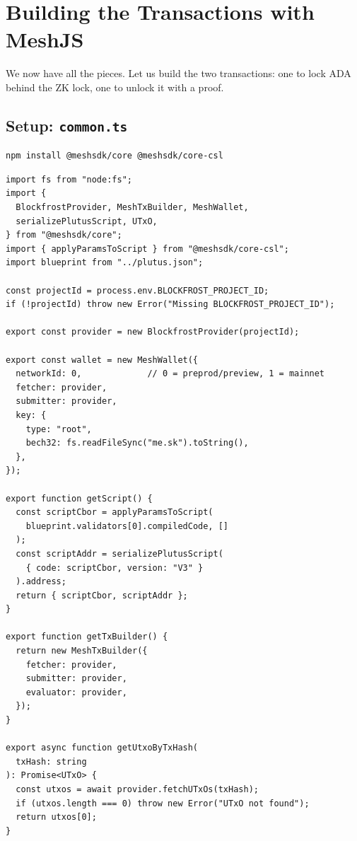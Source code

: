 \section{Building the Transactions with MeshJS} \label{sec:ch7-mesh}

We now have all the pieces. Let us build the two transactions: one to lock ADA
behind the ZK lock, one to unlock it with a proof.

\subsection*{Setup: \texttt{common.ts}}

\begin{verbatim}
npm install @meshsdk/core @meshsdk/core-csl
\end{verbatim}

\begin{verbatim}
import fs from "node:fs";
import {
  BlockfrostProvider, MeshTxBuilder, MeshWallet,
  serializePlutusScript, UTxO,
} from "@meshsdk/core";
import { applyParamsToScript } from "@meshsdk/core-csl";
import blueprint from "../plutus.json";

const projectId = process.env.BLOCKFROST_PROJECT_ID;
if (!projectId) throw new Error("Missing BLOCKFROST_PROJECT_ID");

export const provider = new BlockfrostProvider(projectId);

export const wallet = new MeshWallet({
  networkId: 0,             // 0 = preprod/preview, 1 = mainnet
  fetcher: provider,
  submitter: provider,
  key: {
    type: "root",
    bech32: fs.readFileSync("me.sk").toString(),
  },
});

export function getScript() {
  const scriptCbor = applyParamsToScript(
    blueprint.validators[0].compiledCode, []
  );
  const scriptAddr = serializePlutusScript(
    { code: scriptCbor, version: "V3" }
  ).address;
  return { scriptCbor, scriptAddr };
}

export function getTxBuilder() {
  return new MeshTxBuilder({
    fetcher: provider,
    submitter: provider,
    evaluator: provider,
  });
}

export async function getUtxoByTxHash(
  txHash: string
): Promise<UTxO> {
  const utxos = await provider.fetchUTxOs(txHash);
  if (utxos.length === 0) throw new Error("UTxO not found");
  return utxos[0];
}
\end{verbatim}

